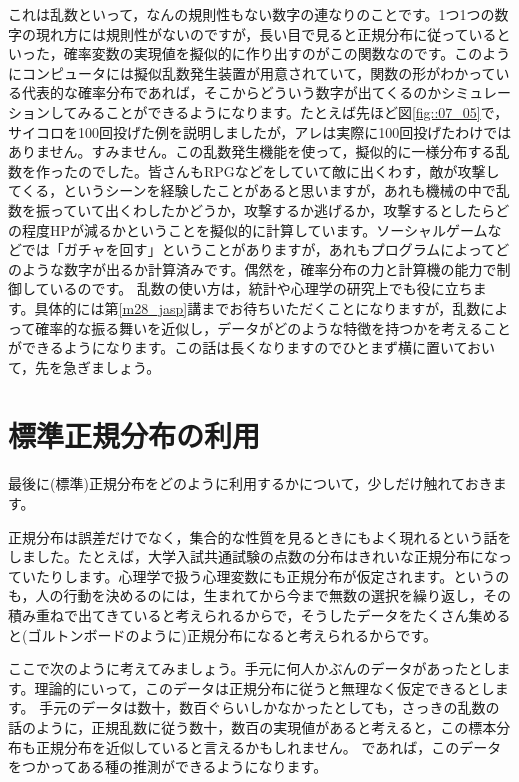 \documentclass{ltjbook}
\begin{document}
これは乱数といって，なんの規則性もない数字の連なりのことです。1つ1つの数字の現れ方には規則性がないのですが，長い目で見ると正規分布に従っているといった，確率変数の実現値を擬似的に作り出すのがこの関数なのです。このようにコンピュータには擬似乱数発生装置が用意されていて，関数の形がわかっている代表的な確率分布であれば，そこからどういう数字が出てくるのかシミュレーションしてみることができるようになります。たとえば先ほど図\ref{fig::07_05}で，サイコロを100回投げた例を説明しましたが，アレは実際に100回投げたわけではありません。すみません。この乱数発生機能を使って，擬似的に一様分布する乱数を作ったのでした。皆さんもRPGなどをしていて敵に出くわす，敵が攻撃してくる，というシーンを経験したことがあると思いますが，あれも機械の中で乱数を振っていて出くわしたかどうか，攻撃するか逃げるか，攻撃するとしたらどの程度HPが減るかということを擬似的に計算しています。ソーシャルゲームなどでは「ガチャを回す」ということがありますが，あれもプログラムによってどのような数字が出るか計算済みです。偶然を，確率分布の力と計算機の能力で制御しているのです。
\label{randomVariablesMethod}
乱数の使い方は，統計や心理学の研究上でも役に立ちます。具体的には第\ref{m28_jasp}講までお待ちいただくことになりますが，乱数によって確率的な振る舞いを近似し，データがどのような特徴を持つかを考えることができるようになります。この話は長くなりますのでひとまず横に置いておいて，先を急ぎましょう。

\section{標準正規分布の利用}
\label{UsefulNormal}
最後に(標準)正規分布をどのように利用するかについて，少しだけ触れておきます。

正規分布は誤差だけでなく，集合的な性質を見るときにもよく現れるという話をしました。たとえば，大学入試共通試験の点数の分布はきれいな正規分布になっていたりします。心理学で扱う心理変数にも正規分布が仮定されます。というのも，人の行動を決めるのには，生まれてから今まで無数の選択を繰り返し，その積み重ねで出てきていると考えられるからで，そうしたデータをたくさん集めると(ゴルトンボードのように)正規分布になると考えられるからです。

ここで次のように考えてみましょう。手元に何人かぶんのデータがあったとします。理論的にいって，このデータは正規分布に従うと無理なく仮定できるとします。
手元のデータは数十，数百ぐらいしかなかったとしても，さっきの乱数の話のように，正規乱数に従う数十，数百の実現値があると考えると，この標本分布も正規分布を近似していると言えるかもしれません。
であれば，このデータをつかってある種の推測ができるようになります。
\end{document}
